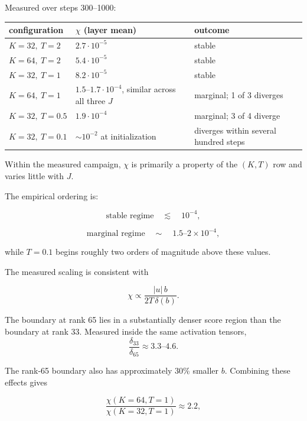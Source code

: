 \documentclass[11pt,a4paper]{article}
\begin{document}
Measured over steps 300--1000:

\begin{center}\small
\begin{tabular}{lll}
\toprule
configuration & \(\chi\) (layer mean) & outcome \\
\midrule

\(K=32,\ T=2\)
&
\(2.7\cdot10^{-5}\)
&
stable
\\

\(K=64,\ T=2\)
&
\(5.4\cdot10^{-5}\)
&
stable
\\

\(K=32,\ T=1\)
&
\(8.2\cdot10^{-5}\)
&
stable
\\

\(K=64,\ T=1\)
&
\(1.5\)--\(1.7\cdot10^{-4}\), similar across all three \(J\)
&
marginal; 1 of 3 diverges
\\

\(K=32,\ T=0.5\)
&
\(1.9\cdot10^{-4}\)
&
marginal; 3 of 4 diverge
\\

\(K=32,\ T=0.1\)
&
\(\sim10^{-2}\) at initialization
&
diverges within several hundred steps
\\

\bottomrule
\end{tabular}
\end{center}

Within the measured campaign, \(\chi\) is primarily a property of the
\((K,T)\) row and varies little with \(J\).

The empirical ordering is:

\[
\text{stable regime}
\quad\lesssim\quad
10^{-4},
\]

\[
\text{marginal regime}
\quad\sim\quad
1.5\text{--}2\times10^{-4},
\]

while \(T=0.1\) begins roughly two orders of magnitude above these values.

The measured scaling is consistent with

\[
\chi
\propto
\frac{|u|\,b}
{2T\,\delta(b)}.
\]

The boundary at rank 65 lies in a substantially denser score region than the
boundary at rank 33.
Measured inside the same activation tensors,
\[
\frac{\delta_{33}}{\delta_{65}}
\approx
3.3\text{--}4.6.
\]

The rank-65 boundary also has approximately 30\% smaller \(b\).
Combining these effects gives

\[
\frac{
\chi(K=64,T=1)
}{
\chi(K=32,T=1)
}
\approx
2.2,
\]
\end{document}
